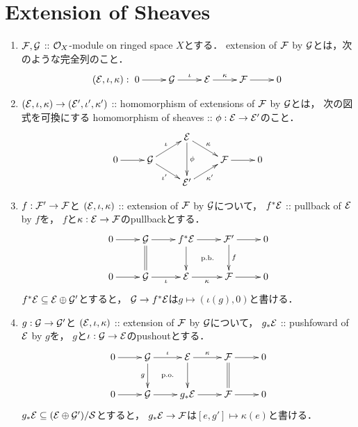 \documentclass[a4paper]{jsarticle}
\makeatletter
\newcommand{\centerpb}{\ar@{}[lu]|{\text{p.b.}}}
\newcommand{\centerpo}{\ar@{}[lu]|{\text{p.o.}}}
\makeatother
\begin{document}
\section{Extension of Sheaves}
    \begin{Def}
        \begin{enumerate}[label=(\roman*), leftmargin=*]
        \item
            $\mathcal{F}, \mathcal{G}$ :: $\mathcal{O}_X$-module on ringed space $X$とする．
            extension of $\mathcal{F}$ by $\mathcal{G}$とは，次のような完全列のこと．
            \[
            (\shE, \iota, \kappa):
                \xymatrix{
                    0 \ar[r]& \shG \ar[r]^-{\iota}& \shE \ar[r]^-{\kappa}& \shF \ar[r]& 0
            }\]

        \item
            $(\mathcal{E}, \iota, \kappa) \to (\mathcal{E}', \iota', \kappa')$
            :: homomorphism of extensions of $\mathcal{F}$ by $\mathcal{G}$とは，
            次の図式を可換にする
            homomorphism of sheaves :: $\phi: \mathcal{E} \to \mathcal{E}'$のこと．
            \[\xymatrix@R=10pt{
                    {}& {}& \shE \ar[dd]^-{\phi} \ar[rd]^-{\kappa}& {}& {} \\
                    0 \ar[r]& \shG \ar[ru]^-{\iota}\ar[rd]_-{\iota'}& {} & \shF \ar[r]& 0 \\
                    {}& {}& \shE' \ar[ru]_-{\kappa'}& {}& {}
            }\]
        
        \item
            $f: \mathcal{F}' \to \mathcal{F}$と
            $(\mathcal{E}, \iota, \kappa)$ :: extension of $\mathcal{F}$ by $\mathcal{G}$について，
            $f^* \mathcal{E}$ :: pullback of $\mathcal{E}$ by $f$を，
            $f$と$\kappa: \mathcal{E} \to \mathcal{F}$のpullbackとする．
            \[\vcenter{\xymatrix{
                0 \ar[r]& \shG \ar@{=}[d]\ar[r]& f^*\shE \ar[d]\ar[r]& \shF' \ar[d]^-{f}\ar[r]& 0 \\
                0 \ar[r]& \shG \ar[r]_-{\iota}& \shE \ar[r]_-{\kappa}& \shF \ar[r]\centerpb& 0
            }}\]
            $f^* \mathcal{E} \subseteq \mathcal{E} \oplus \mathcal{G}'$とすると，
            $\mathcal{G} \to f^*\mathcal{E}$は$g \mapsto (\iota(g), 0)$と書ける．

        \item
            $g: \mathcal{G} \to \mathcal{G}'$と
            $(\mathcal{E}, \iota, \kappa)$ :: extension of $\mathcal{F}$ by $\mathcal{G}$について，
            $g_* \mathcal{E}$ :: pushfoward of $\mathcal{E}$ by $g$を，
            $g$と$\iota: \mathcal{G} \to \mathcal{E}$のpushoutとする．
            \[\vcenter{\xymatrix{
                0 \ar[r]& \shG \ar[d]_-{g}\ar[r]^-{\iota}& \shE \ar[d]\ar[r]^-{\kappa}& \shF \ar@{=}[d]\ar[r]& 0 \\
                0 \ar[r]& \shG \ar[r]& g_*\shE \ar[r]\centerpo& \shF \ar[r]& 0
            }}\]
            $g_* \mathcal{E} \subseteq (\mathcal{E} \oplus \mathcal{G}')/\mathcal{S}$とすると，
            $g_*\mathcal{E} \to \mathcal{F}$は$[e, g'] \mapsto \kappa(e)$と書ける．
    \end{enumerate}
    \end{Def}
\end{document}
